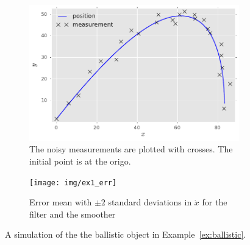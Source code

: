 \begin{figure}[htb]%
    \centering%
    \begin{subfigure}[b]{0.5\textwidth}%
    	\centering%
    	\includegraphics[width=\textwidth]{img/ex1_pos_meas}%
    	\caption{The noisy measurements are plotted with crosses. The initial point is at the origo.}%
		\label{fig:ballistic_flight}%
    \end{subfigure}%
    \begin{subfigure}[b]{0.5\textwidth}%
    	\centering%
		\texttt{[image: img/ex1\_err]}%
    	\caption{Error mean with $\pm 2$ standard deviations in $\dot{x}$ for the filter and the smoother}%
		\label{fig:ballistic_err}%
    \end{subfigure}%
	\caption{A simulation of the the ballistic object in 
	Example~\ref{ex:ballistic}.}
	\label{fig:ballistic}
 \end{figure}



